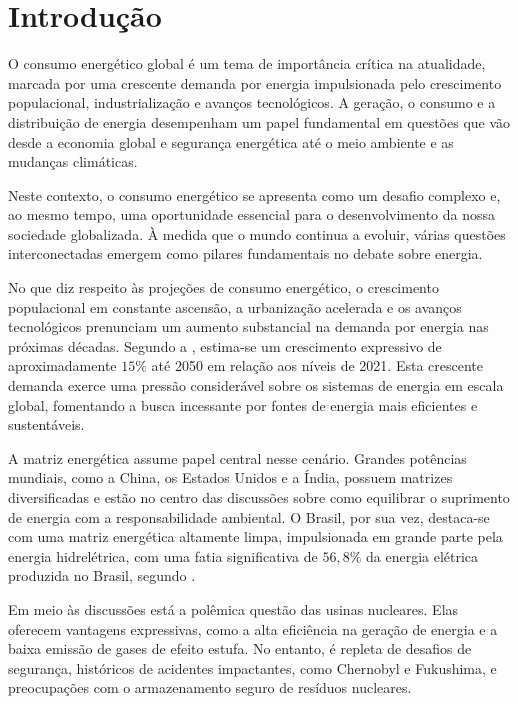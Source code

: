 \chapter{Introdução} \label{chap:introduction}

O consumo energético global é um tema de importância crítica na atualidade, marcada por uma crescente demanda por energia impulsionada pelo crescimento populacional, industrialização e avanços tecnológicos. A geração, o consumo e a distribuição de energia desempenham um papel fundamental em questões que vão desde a economia global e segurança energética até o meio ambiente e as mudanças climáticas.

Neste contexto, o consumo energético se apresenta como um desafio complexo e, ao mesmo tempo, uma oportunidade essencial para o desenvolvimento da nossa sociedade globalizada. À medida que o mundo continua a evoluir, várias questões interconectadas emergem como pilares fundamentais no debate sobre energia.

No que diz respeito às projeções de consumo energético, o crescimento populacional em constante ascensão, a urbanização acelerada e os avanços tecnológicos prenunciam um aumento substancial na demanda por energia nas próximas décadas. Segundo a \citet{ExxonMobil2023}, estima-se um crescimento expressivo de aproximadamente \(15\%\) até 2050 em relação aos níveis de 2021. Esta crescente demanda exerce uma pressão considerável sobre os sistemas de energia em escala global, fomentando a busca incessante por fontes de energia mais eficientes e sustentáveis.

A matriz energética assume papel central nesse cenário. Grandes potências mundiais, como a China, os Estados Unidos e a Índia, possuem matrizes diversificadas e estão no centro das discussões sobre como equilibrar o suprimento de energia com a responsabilidade ambiental. O Brasil, por sua vez, destaca-se com uma matriz energética altamente limpa, impulsionada em grande parte pela energia hidrelétrica, com uma fatia significativa de \(56,8\%\) da energia elétrica produzida no Brasil, segundo \citet{epe2022}.

Em meio às discussões está a polêmica questão das usinas nucleares. Elas oferecem vantagens expressivas, como a alta eficiência na geração de energia e a baixa emissão de gases de efeito estufa. No entanto, é repleta de desafios de segurança, históricos de acidentes impactantes, como Chernobyl e Fukushima, e preocupações com o armazenamento seguro de resíduos nucleares.

